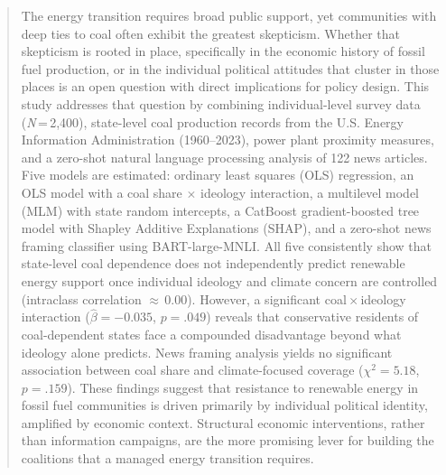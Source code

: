 \documentclass[9pt,twoside]{pnas-new}
\begin{document}
\begin{abstract}
The energy transition requires broad public support, yet communities with deep
ties to coal often exhibit the greatest skepticism. Whether that skepticism is
rooted in place, specifically in the economic history of fossil fuel production,
or in the individual political attitudes that cluster in those places is an open
question with direct implications for policy design. This study addresses that
question by combining individual-level survey data (\textit{N}\,=\,2,400),
state-level coal production records from the U.S. Energy Information Administration
(1960--2023), power plant proximity measures, and a zero-shot natural language
processing analysis of 122 news articles. Five models are estimated: ordinary
least squares (OLS) regression, an OLS model with a coal share $\times$ ideology
interaction, a multilevel model (MLM) with state random intercepts, a CatBoost
gradient-boosted tree model with Shapley Additive Explanations (SHAP), and a
zero-shot news framing classifier using BART-large-MNLI. All five consistently
show that state-level coal dependence does not independently predict renewable
energy support once individual ideology and climate concern are controlled
(intraclass correlation $\approx$\,0.00). However, a significant
coal\,$\times$\,ideology interaction ($\hat{\beta} = -0.035$, $p = .049$) reveals
that conservative residents of coal-dependent states face a compounded disadvantage
beyond what ideology alone predicts. News framing analysis yields no significant
association between coal share and climate-focused coverage
($\chi^2 = 5.18$, $p = .159$). These findings suggest that resistance to
renewable energy in fossil fuel communities is driven primarily by individual
political identity, amplified by economic context. Structural economic
interventions, rather than information campaigns, are the more promising lever
for building the coalitions that a managed energy transition requires.
\end{abstract}
\maketitle
\thispagestyle{firststyle}
\Firstpage
\end{document}

